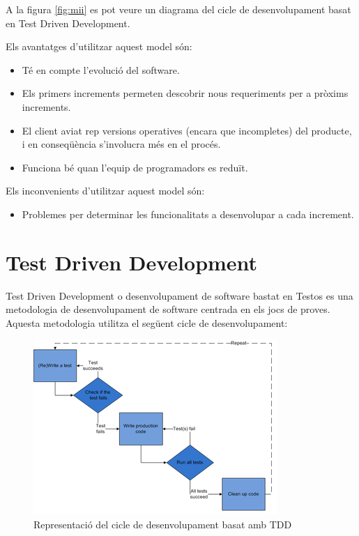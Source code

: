 A la figura \ref{fig:mii} es pot veure un diagrama del cicle de desenvolupament basat en Test Driven Development.

Els avantatges d’utilitzar aquest model són:

\begin{itemize}
\item{Té en compte l’evolució del software.}
\item{Els primers increments permeten descobrir nous requeriments per a pròxims increments.}
\item{El client aviat rep versions operatives (encara que incompletes) del producte, i en conseqüència s’involucra més en el procés.}
\item{Funciona bé quan l’equip de programadors es reduït.}
\end{itemize}

Els inconvenients d’utilitzar aquest model són:

\begin{itemize}
\item{Problemes per determinar les funcionalitats a desenvolupar a cada increment.}
\end{itemize}

\section{Test Driven Development}

Test Driven Development o desenvolupament de software bastat en Testos es una metodologia de desenvolupament de software centrada en els jocs de proves. Aquesta metodologia utilitza el següent cicle de desenvolupament: 

\begin{figure}[htbp]
\centering\includegraphics{img/test-driven-development.png}
\caption{Representació del cicle de desenvolupament basat amb TDD}
\label{fig:tdd}
\end{figure} 

